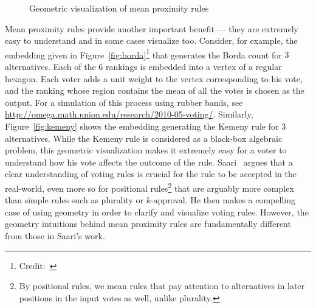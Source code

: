\documentclass[prodmode,acmec]{ec-acmsmall}
\begin{document}
{\footnotesize
\begin{figure}
\centering
{}\qquad
{}
\caption{Geometric visualization of mean proximity rules}
\label{fig:geometric}
\end{figure}
}

Mean proximity rules provide another important benefit --- they are extremely easy to understand and in some cases visualize too. Consider, for example, the embedding given in Figure~\ref{fig:borda}\footnote{Credit:~\cite{ovchinnikov2005hyperplane}} that generates the Borda count for $3$ alternatives. Each of the $6$ rankings is embedded into a vertex of a regular hexagon. Each voter adds a unit weight to the vertex corresponding to his vote, and the ranking whose region contains the mean of all the votes is chosen as the output. For a simulation of this process using rubber bands, see \url{http://omega.math.union.edu/research/2010-05-voting/}. Similarly, Figure~\ref{fig:kemeny} shows the embedding generating the Kemeny rule for $3$ alternatives. While the Kemeny rule is considered as a black-box algebraic problem, this geometric visualization makes it extremely easy for a voter to understand how his vote affects the outcome of the rule. Saari~\cite{saari1995basic} argues that a clear understanding of voting rules is crucial for the rule to be accepted in the real-world, even more so for positional rules\footnote{By positional rules, we mean rules that pay attention to alternatives in later positions in the input votes as well, unlike plurality.} that are arguably more complex than simple rules such as plurality or $k$-approval. He then makes a compelling case of using geometry in order to clarify and visualize voting rules. However, the geometry intuitions behind mean proximity rules are fundamentally different from those in Saari's work. 
\end{document}
